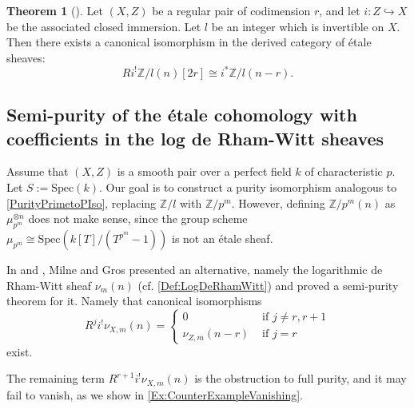\documentclass{amsart}
\def\Spec{\textrm{Spec}}
\theoremstyle{definition}
\newtheorem{theorem}{Theorem}[section]
\numberwithin{equation}{section}
\begin{document}
\begin{theorem}[\cite{FujiwaraPurity}]\label{PurityPrimeToP}
	Let $(X,Z)$ be a regular pair of codimension $r$, and let $i: Z \hookrightarrow X$ be the associated closed immersion. Let $l$ be an integer which is invertible on $X$. Then there exists a canonical isomorphism in the derived category of étale sheaves:
	\begin{equation}\label{PurityPrimetoPIso}
		Ri^! \mathbb{Z}/l(n)[2r] \cong i^* \mathbb{Z}/l(n - r).
	\end{equation}

\end{theorem}




\subsection{Semi-purity of the étale cohomology with coefficients in the log de Rham-Witt sheaves}
Assume that $(X,Z)$ is a smooth pair over a perfect field $k$ of characteristic $p$. Let $S:=\Spec(k)$. Our goal is to construct a purity isomorphism analogous to \eqref{PurityPrimetoPIso}, replacing $\mathbb{Z}/l$ with $\mathbb{Z}/p^m$. However, defining $\mathbb{Z}/p^m(n)$ as $\mu_{p^m}^{\otimes n}$ does not make sense, since the group scheme $\mu_{p^m} \cong \Spec(k[T]/(T^{p^m} - 1))$ is not an \'etale sheaf.


In \cite[Theorem 2.1]{MilneValuesOfZeta} and \cite[Théorème 3.5.8]{CohomologyLogGros}, Milne and Gros presented an alternative, namely the logarithmic de Rham-Witt sheaf $\nu_m(n)$ (cf. \cref{Def:LogDeRhamWitt})  and proved a semi-purity theorem for it. Namely that canonical isomorphisms
\begin{equation}\label{eq:semi-purityEtale}
	R^ji^!\nu_{X,m}(n)=\begin{cases}
		0 &\textrm{ if } j\neq r,r+1\\
		\nu_{Z,m}(n-r) &\textrm{ if } j=r
	\end{cases}
\end{equation}
exist. 

The remaining term $R^{r+1}i^!\nu_{X,m}(n)$ is the obstruction to full purity, and it may fail to vanish, as we show in \cref{Ex:CounterExampleVanishing}.
\end{document}
